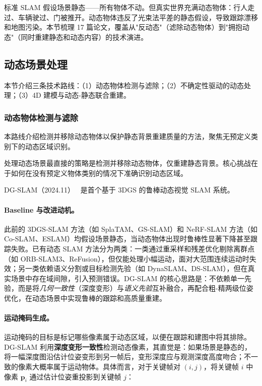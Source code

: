 标准 SLAM 假设场景静态——所有物体不动。但真实世界充满动态物体：行人走过、车辆驶过、门被推开。动态物体违反了光束法平差的静态假设，导致跟踪漂移和地图污染。本节梳理 17 篇论文，覆盖从"反动态"（滤除动态物体）到"拥抱动态"（同时重建静态和动态内容）的技术演进。

\subsection{动态场景处理}
\label{ss:15_6a}

本节介绍三条技术路线：（1）动态物体检测与滤除；（2）不确定性驱动的动态处理；（3）4D 建模与动态-静态联合重建。

\subsubsection{动态物体检测与滤除}

本路线介绍检测并移除动态物体以保护静态背景重建质量的方法，聚焦无预定义类别下的动态区域识别。

处理动态场景最直接的策略是检测并移除动态物体，仅重建静态背景。核心挑战在于如何在没有预定义物体类别的情况下准确识别动态区域。

DG-SLAM（2024.11）~\cite{2411_08373} 是首个基于 3DGS 的鲁棒动态视觉 SLAM 系统。

\paragraph{Baseline 与改进动机。}
此前的 3DGS-SLAM 方法（如 SplaTAM、GS-SLAM）和 NeRF-SLAM 方法（如 Co-SLAM、ESLAM）均假设场景静态，当动态物体出现时鲁棒性显著下降甚至跟踪失败。已有动态 SLAM 方法分为两类：一类通过重采样和残差优化剔除离群点（如 ORB-SLAM3、ReFusion），但仅能处理小幅运动，面对大范围连续运动时失效；另一类依赖语义分割或目标检测先验（如 DynaSLAM、DS-SLAM），但在真实场景中存在域间隙，引入预测错误。DG-SLAM 的核心思路是：不依赖单一先验，而是将\emph{几何一致性}（深度变形）与\emph{语义先验}互补融合，再配合粗-精两级位姿优化，在动态场景中实现鲁棒的跟踪和高质量重建。

\paragraph{运动掩码生成。}
运动掩码的目标是标记哪些像素属于动态区域，以便在跟踪和建图中将其排除。DG-SLAM 利用\textbf{深度变形一致性}检测动态像素，其直觉是：如果场景是静态的，将一幅深度图沿估计位姿变形到另一帧后，变形深度应与观测深度高度吻合；不一致的像素大概率属于运动物体。具体而言，对于关键帧对 $(i, j)$，将关键帧 $i$ 中像素 $\mathbf{p}_i$ 通过估计位姿重投影到关键帧 $j$：

